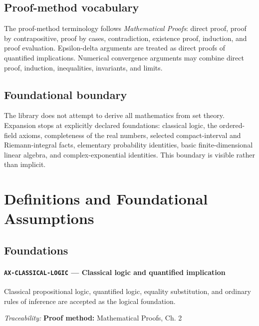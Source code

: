\documentclass[10pt]{article}
\newcommand{\pidraw}[1]{\begingroup\urlstyle{tt}\nolinkurl{#1}\endgroup}
\theoremstyle{definition}
\theoremstyle{remark}
\begin{document}
\subsection{Proof-method vocabulary}

The proof-method terminology follows \emph{Mathematical Proofs}: direct proof, proof by
contrapositive, proof by cases, contradiction, existence proof, induction, and proof evaluation.
Epsilon-delta arguments are treated as direct proofs of quantified implications. Numerical
convergence arguments may combine direct proof, induction, inequalities, invariants, and limits.

\subsection{Foundational boundary}

The library does not attempt to derive all mathematics from set theory. Expansion stops at explicitly
declared foundations: classical logic, the ordered-field axioms, completeness of the real numbers,
selected compact-interval and Riemann-integral facts, elementary probability identities, basic
finite-dimensional linear algebra, and complex-exponential identities. This boundary is visible
rather than implicit.
\section{Definitions and Foundational Assumptions}

\subsection{Foundations}

\label{prf:AX-CLASSICAL-LOGIC}

\paragraph{\pidraw{AX-CLASSICAL-LOGIC} --- Classical logic and quantified implication}

Classical propositional logic, quantified logic, equality substitution, and ordinary rules of inference are accepted as the logical foundation.

\smallskip\noindent\textit{Traceability:} \textbf{Proof method:} Mathematical Proofs, Ch. 2\par

\label{prf:AX-COMPLEX-EXP}
\end{document}

